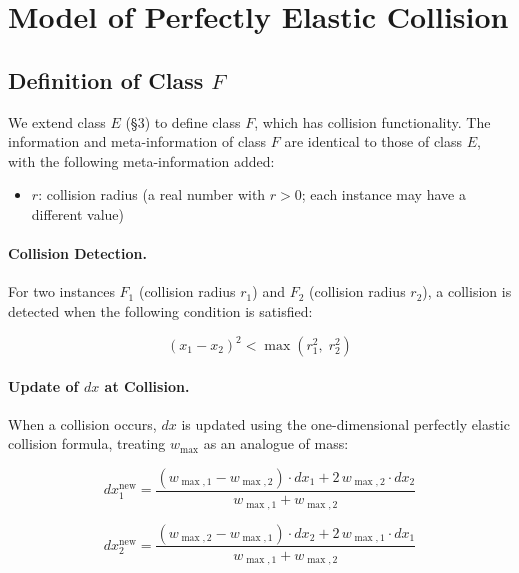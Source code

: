 \documentclass[12pt,a4paper]{article}
\begin{document}
\section{Model of Perfectly Elastic Collision}

\subsection{Definition of Class $F$}

We extend class $E$ (\S3) to define class $F$, which has collision functionality. The information and meta-information of class $F$ are identical to those of class $E$, with the following meta-information added:

\begin{itemize}
  \item $r$: collision radius (a real number with $r > 0$; each instance may have a different value)
\end{itemize}

\paragraph{Collision Detection.}

For two instances $F_1$ (collision radius $r_1$) and $F_2$ (collision radius $r_2$), a collision is detected when the following condition is satisfied:

\begin{equation}
  (x_1 - x_2)^2 < \max(r_1^2,\; r_2^2)
\end{equation}

\paragraph{Update of $dx$ at Collision.}

When a collision occurs, $dx$ is updated using the one-dimensional perfectly elastic collision formula, treating $w_{\max}$ as an analogue of mass:

\begin{equation}
  dx_1^{\text{new}} = \frac{(w_{\max,1} - w_{\max,2}) \cdot dx_1 + 2\, w_{\max,2} \cdot dx_2}{w_{\max,1} + w_{\max,2}}
\end{equation}

\begin{equation}
  dx_2^{\text{new}} = \frac{(w_{\max,2} - w_{\max,1}) \cdot dx_2 + 2\, w_{\max,1} \cdot dx_1}{w_{\max,1} + w_{\max,2}}
\end{equation}
\end{document}
